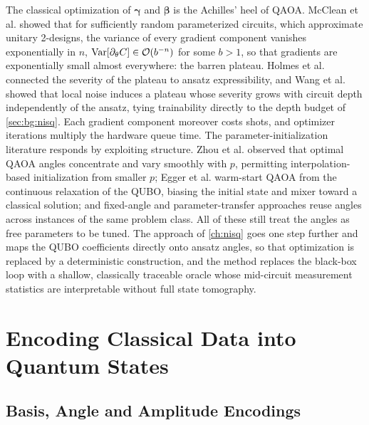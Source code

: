 The classical optimization of $\bm{\gamma}$ and $\bm{\beta}$ is the Achilles' heel of QAOA. McClean et al. \cite{mcclean2018barren} showed that for sufficiently random parameterized circuits, which approximate unitary 2-designs, the variance of every gradient component vanishes exponentially in $n$, $\mathrm{Var}[\partial_{\theta}C]\in\mathcal{O}\!\left(b^{-n}\right)$ for some $b>1$, so that gradients are exponentially small almost everywhere: the barren plateau. Holmes et al. \cite{holmes2022expressibility} connected the severity of the plateau to ansatz expressibility, and Wang et al. \cite{wang2021noisebp} showed that local noise induces a plateau whose severity grows with circuit depth independently of the ansatz, tying trainability directly to the depth budget of \cref{sec:bg:nisq}. Each gradient component moreover costs shots, and optimizer iterations multiply the hardware queue time. The parameter-initialization literature responds by exploiting structure. Zhou et al. \cite{zhou2020qaoa} observed that optimal QAOA angles concentrate and vary smoothly with $p$, permitting interpolation-based initialization from smaller $p$; Egger et al. \cite{egger2021warmstart} warm-start QAOA from the continuous relaxation of the QUBO, biasing the initial state and mixer toward a classical solution; and fixed-angle and parameter-transfer approaches reuse angles across instances of the same problem class. All of these still treat the angles as free parameters to be tuned. The \deal{} approach of \cref{ch:nisq} \cite{guo2025deal} goes one step further and maps the QUBO coefficients directly onto ansatz angles, so that optimization is replaced by a deterministic construction, and the \qawa{} method \cite{guo2025qawa} replaces the black-box loop with a shallow, classically traceable oracle whose mid-circuit measurement statistics are interpretable without full state tomography.

\section{Encoding Classical Data into Quantum States}\label{sec:bg:encoding}

\subsection{Basis, Angle and Amplitude Encodings}

